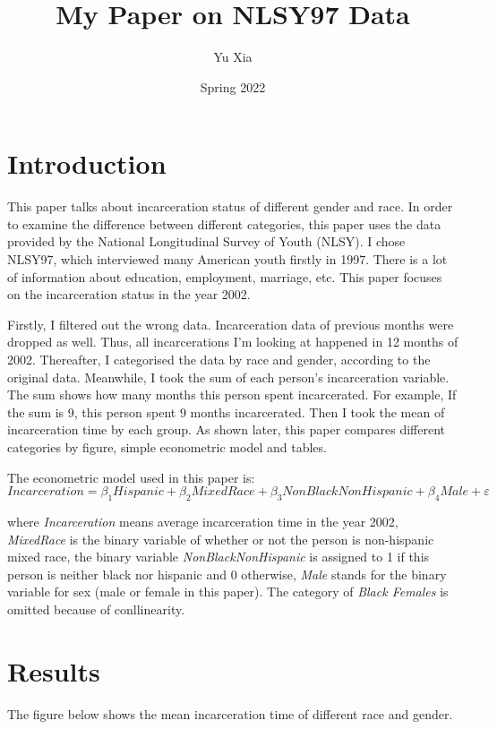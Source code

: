 \documentclass{article}
\author{Yu Xia}
\title{My Paper on NLSY97 Data}
\date{Spring 2022}
\begin{document}
\maketitle

\section{Introduction}

This paper talks about incarceration status of different gender and race. In order to examine the difference between different categories, this paper uses the data provided by the National Longitudinal Survey of Youth (NLSY). I chose NLSY97, which interviewed many American youth firstly in 1997. There is a lot of information about education, employment, marriage, etc. This paper focuses on the incarceration status in the year 2002.

Firstly, I filtered out the wrong data. Incarceration data of previous months were dropped as well. Thus, all incarcerations I'm looking at happened in 12 months of 2002. Thereafter, I categorised the data by race and gender, according to the original data. Meanwhile, I took the sum of each person's incarceration variable. The sum shows how many months this person spent incarcerated. For example, If the sum is 9, this person spent 9 months incarcerated. Then I took the mean of incarceration time by each group. As shown later, this paper compares different categories by figure, simple econometric model and tables. 

The econometric model used in this paper is:
$$
    Incarceration = \beta_1Hispanic + \beta_2Mixed Race + \beta_3Non Black Non Hispanic + \beta_4Male + \varepsilon
$$

where \textit{Incarceration} means average incarceration time in the year 2002, \textit{MixedRace} is the binary variable of whether or not the person is non-hispanic mixed race, the binary variable \textit{NonBlackNonHispanic} is assigned to 1 if this person is neither black nor hispanic and 0 otherwise, \textit{Male} stands for the binary variable for sex (male or female in this paper). The category of \textit{Black Females} is omitted because of conllinearity. 

\newpage

\section{Results}

The figure below shows the mean incarceration time of different race and gender. 
\end{document}
